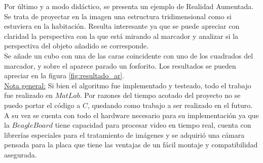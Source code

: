 \documentclass[main]{subfiles}
\begin{document}
Por último y a modo didáctico, se presenta un ejemplo de Realidad Aumentada. Se trata de proyectar en la imagen una estructura tridimensional como si estuviera en la habitación. Resulta interesante ya que se puede apreciar con claridad la perspectiva con la que está mirando al marcador y analizar si la perspectiva del objeto añadido se corresponde.\\

Se añade un cubo con una de las caras coincidente con uno de los cuadrados del marcador, y sobre el aparece parado un fosforito. Los resultados se pueden apreciar en la figura \ref{fig:resultado_ar}.\\[25pt]

\underline{Nota general:} Si bien el algoritmo fue implementado y testeado, todo el trabajo fue realizado en $MatLab$. Por razones del tiempo acotado del proyecto no se puedo portar el código a $C$, quedando como trabajo a ser realizado en el futuro. A su vez se cuenta con todo el hardware necesario para su implementación ya que la $BeagleBoard$ tiene capacidad para procesar video en tiempo real, cuenta con librerías especiales para el tratamiento de imágenes y se adquirió una cámara pensada para la placa que tiene las ventajas de un fácil montaje y compatibilidad asegurada.
\end{document}
